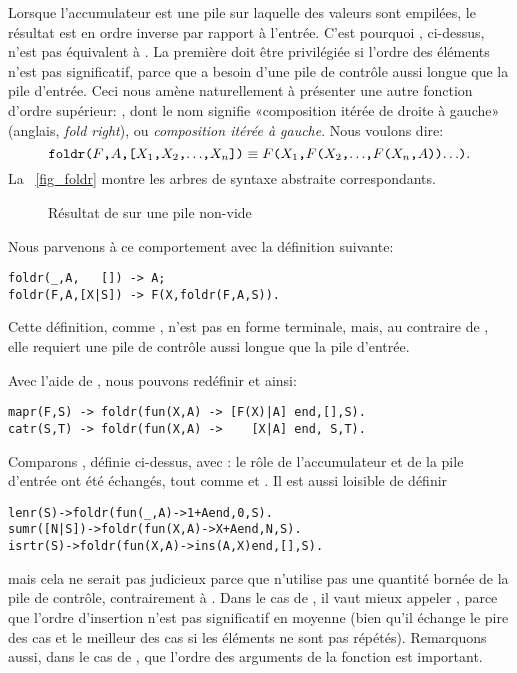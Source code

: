 Lorsque l'accumulateur est une pile sur laquelle des valeurs sont
empilées, le résultat est en ordre inverse par rapport à
l'entrée. C'est pourquoi , ci-dessus, n'est pas
équivalent à . La première doit être privilégiée si
l'ordre des éléments n'est pas significatif, parce que 
a besoin d'une pile de contrôle aussi longue que la pile
d'entrée. Ceci nous amène naturellement à présenter une autre fonction
d'ordre supérieur: , dont le nom signifie
«composition itérée de droite à gauche» (anglais, \emph{fold right}),
ou \emph{composition itérée à gauche}. Nous voulons dire:
\begin{equation*}
\texttt{foldr(\(F\),\(A\),[\(X_1\),\(X_2\),\(\ldots\),\(X_{n}\)])}
\equiv
\texttt{\(F\)(\(X_1\),\(F\)(\(X_2\),\(\ldots\),\(F\)(\(X_{n}\),\(A\)))\(\ldots\))}.
\end{equation*}
La \fig~\vref{fig_foldr} montre les arbres de syntaxe abstraite
correspondants.
\begin{figure}
\centering
{}
\qquad
{}
\caption{Résultat de  sur une pile non-vide
\label{fig_foldr}}
\end{figure}
Nous parvenons à ce comportement avec la définition suivante:
\begin{verbatim}
foldr(_,A,   []) -> A;
foldr(F,A,[X|S]) -> F(X,foldr(F,A,S)).
\end{verbatim}
Cette définition, comme , n'est pas en forme
terminale, mais, au contraire de , elle requiert une
pile de contrôle aussi longue que la pile d'entrée.

Avec l'aide de , nous pouvons redéfinir
 et  ainsi:
\begin{verbatim}
mapr(F,S) -> foldr(fun(X,A) -> [F(X)|A] end,[],S).
catr(S,T) -> foldr(fun(X,A) ->    [X|A] end, S,T).
\end{verbatim}
Comparons , définie ci-dessus, avec :
le rôle de l'accumulateur et de la pile d'entrée ont été échangés,
tout comme  et . Il est aussi
loisible de définir
\begin{alltt}
lenr(S)     -> foldr(fun(_,A) -> 1+A end, 0,S).\hfill% \emph{Mauvais}
sumr([N|S]) -> foldr(fun(X,A) -> X+A end, N,S).\hfill% \emph{Mauvais}
isrtr(S)    -> foldr(fun(X,A) -> ins(A,X) end,[],S).\hfill% \emph{Non}
\end{alltt}
mais cela ne serait pas judicieux parce que 
n'utilise pas une quantité bornée de la pile de contrôle,
contrairement à . Dans le cas de , il
vaut mieux appeler , parce que l'ordre d'insertion
n'est pas significatif en moyenne (bien qu'il échange le pire des cas
et le meilleur des cas si les éléments ne sont pas
répétés). Remarquons aussi, dans le cas de , que
l'ordre des arguments de la fonction  est important.

